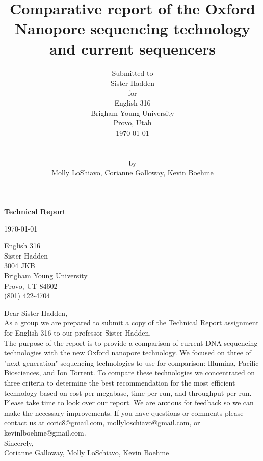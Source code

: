 \documentclass[12pt,letterpaper]{report}
\title{Comparative report of the Oxford Nanopore sequencing technology and current sequencers}
\author{Submitted to \\
Sister Hadden \\
for \\
English 316 \\
Brigham Young University \\
Provo, Utah \\
\today \\
\\
\\
by \\
Molly LoShiavo, Corianne Galloway, Kevin Boehme}
\date{}
\renewcommand{\thepage}{\roman{page}}%
\begin{document}
\maketitle

\begin{center}
\Huge\textbf{Technical Report}
\end{center}
\begin{flushleft}
\today \\[1\baselineskip]
\begin{singlespace}
English 316 \\
Sister Hadden \\
3004 JKB \\
Brigham Young University \\
Provo, UT 84602 \\
(801) 422-4704 \\[1\baselineskip]
\end{singlespace}
Dear Sister Hadden, \\[1\baselineskip]
As a group we are prepared to submit a copy of the Technical Report assignment for English 316 to our professor Sister Hadden.\\ [1\baselineskip]
The purpose of the report is to provide a comparison of current DNA sequencing technologies with the new Oxford nanopore technology. We focused on three of "next-generation" sequencing technologies to use for comparison: Illumina, Pacific Biosciences, and Ion Torrent. To compare these technologies we concentrated on three criteria to determine the best recommendation for the most efficient technology based on cost per megabase, time per run, and throughput per run. \\[1\baselineskip]
Please take time to look over our report. We are anxious for feedback so we can make the necessary improvements. If you have questions or comments please contact us at coric8@gmail.com, mollyloschiavo@gmail.com, or kevinlboehme@gmail.com. \\ [1\baselineskip]
Sincerely,\\[1\baselineskip]
Corianne Galloway, Molly LoSchiavo, Kevin Boehme
\end{flushleft}

\clearpage


\renewcommand*\contentsname{Table of Contents}
\setcounter{page}{3}
\renewcommand{\thepage}{\roman{page}}%
\tableofcontents
\clearpage
\end{document}
